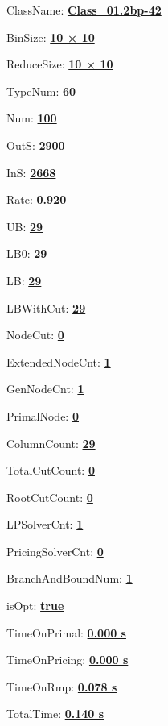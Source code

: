 \documentclass[11pt]{article}
\begin{document}
\pagestyle{empty}


ClassName: \underline{\textbf{Class_01.2bp-42}}
\par
BinSize: \underline{\textbf{10 × 10}}
\par
ReduceSize: \underline{\textbf{10 × 10}}
\par
TypeNum: \underline{\textbf{60}}
\par
Num: \underline{\textbf{100}}
\par
OutS: \underline{\textbf{2900}}
\par
InS: \underline{\textbf{2668}}
\par
Rate: \underline{\textbf{0.920}}
\par
UB: \underline{\textbf{29}}
\par
LB0: \underline{\textbf{29}}
\par
LB: \underline{\textbf{29}}
\par
LBWithCut: \underline{\textbf{29}}
\par
NodeCut: \underline{\textbf{0}}
\par
ExtendedNodeCnt: \underline{\textbf{1}}
\par
GenNodeCnt: \underline{\textbf{1}}
\par
PrimalNode: \underline{\textbf{0}}
\par
ColumnCount: \underline{\textbf{29}}
\par
TotalCutCount: \underline{\textbf{0}}
\par
RootCutCount: \underline{\textbf{0}}
\par
LPSolverCnt: \underline{\textbf{1}}
\par
PricingSolverCnt: \underline{\textbf{0}}
\par
BranchAndBoundNum: \underline{\textbf{1}}
\par
isOpt: \underline{\textbf{true}}
\par
TimeOnPrimal: \underline{\textbf{0.000 s}}
\par
TimeOnPricing: \underline{\textbf{0.000 s}}
\par
TimeOnRmp: \underline{\textbf{0.078 s}}
\par
TotalTime: \underline{\textbf{0.140 s}}
\par
\newpage


\end{document}
